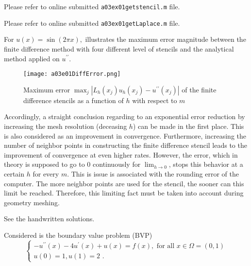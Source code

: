 %
 Please refer to online submitted \texttt{a03ex01getstencil.m} file.

%
 Please refer to online submitted \texttt{a03ex01getLaplace.m} file.

%
For $u(x) = \sin{(2\pi x)}, $\text{ } illustrates the maximum error magnitude between the finite difference method with four different level of stencils and the analytical method applied on $u^{\prime\prime}$.
\begin{figure}[H]
\vspace*{\FigUpperVSpace}
	\texttt{[image: a03e01DiffError.png]} 
	\caption{Maximum error $\max_j|L_h(x_j)u_h(x_j)-u^{\prime\prime}(x_j)|$ of the finite difference stencils as a function of $h$ with respect to $m$}
	\label{fig:a03e01DiffError}
\end{figure}
Accordingly, a straight conclusion regarding to an exponential error reduction by increasing the mesh resolution (deceasing $h$) can be made in the first place.
This is also considered as an improvement in convergence.
Furthermore, increasing the number of neighbor points in constructing the finite difference stencil leads to the improvement of convergence at even higher rates.
However, the error, which in theory is supposed to go to 0 continuously for $\lim_{h\rightarrow0}$, stops this behavior at a certain $h$ for every $m$.
This is issue is associated with the rounding error of the computer.
The more neighbor points are used for the stencil, the sooner can this limit be reached.
Therefore, this limiting fact must be taken into account during geometry meshing.

%
 See the handwritten solutions.

Considered is the boundary value problem (BVP)
\begin{equation}
	\begin{cases}
		-u^{\prime\prime}(x) - 4u^\prime(x) + u(x) = f(x), \text{ for all } x \in \Omega = (0,1) \\
		u(0)=1, u(1) = 2 \text{ .}
	\end{cases}
\end{equation}

